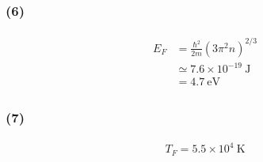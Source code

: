 \documentclass[uplatex,a4j,11pt,dvipdfmx]{jsarticle}
\begin{document}
\subsubsection*{(6)}
\begin{align}
  \begin{split}
    E_F&=\frac{\hbar^2}{2m}(3\pi^2n)^{2/3}\\
    &\simeq7.6\times10^{-19}\ \si{\joule}\\
    &=4.7\ \si{\electronvolt}
  \end{split}
\end{align}
\subsubsection*{(7)}
\begin{align}
  T_F=5.5\times10^4\ \si{\kelvin}
\end{align}
\end{document}
